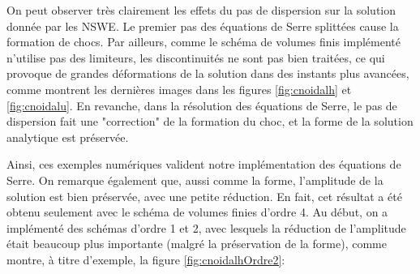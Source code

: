 \indent On peut observer très clairement les effets du pas de dispersion sur la solution donnée par les NSWE. Le premier pas des équations de Serre splittées cause la formation de chocs. Par ailleurs, comme le schéma de volumes finis implémenté n'utilise pas des limiteurs, les discontinuités ne sont pas bien traitées, ce qui provoque de grandes déformations de la solution dans des instants plus avancées, comme montrent les dernières images dans les figures \ref{fig:cnoidalh} et \ref{fig:cnoidalu}. En revanche, dans la résolution des équations de Serre, le pas de dispersion fait une "correction" de la formation du choc, et la forme de la solution analytique est préservée.

\indent Ainsi, ces exemples numériques valident notre implémentation des équations de Serre. On remarque également que, aussi comme la forme, l'amplitude de la solution est bien préservée, avec une petite réduction. En fait, cet résultat a été obtenu seulement avec le schéma de volumes finies d'ordre 4. Au début, on a implémenté des schémas d'ordre 1 et 2, avec lesquels la réduction de l'amplitude était beaucoup plus importante (malgré la préservation de la forme), comme montre, à titre d'exemple, la figure \ref{fig:cnoidalhOrdre2}:


